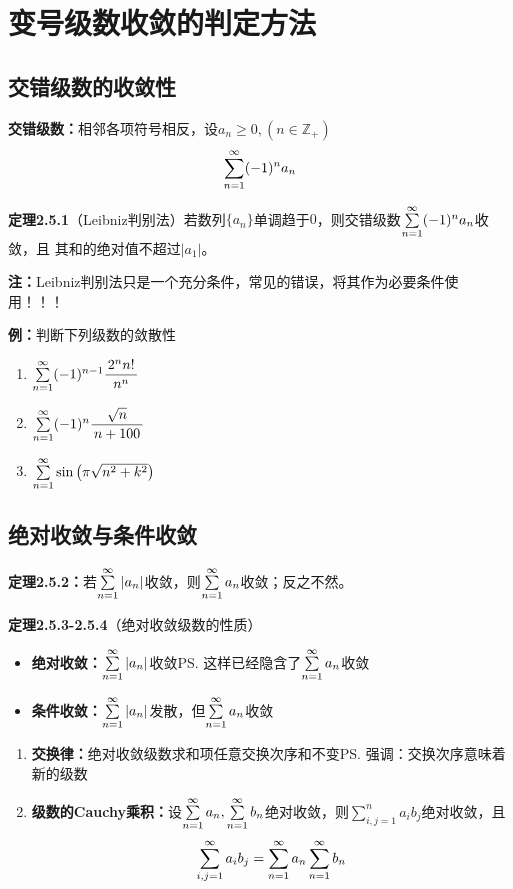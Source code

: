 \section{变号级数收敛的判定方法}

\subsection{交错级数的收敛性}

{\bf 交错级数：}相邻各项符号相反，设$a_n\geq 0,(n\in\mathbb{Z}_+)$
$$\sum\limits_{n=1}^{\infty}(-1)^na_n$$

{\bf 定理2.5.1}（Leibniz判别法）若数列$\{a_n\}$单调趋于$0$，则交错级数$\sum\limits_{n=1}^{\infty} (-1)^na_n$收敛，且
其和的绝对值不超过$|a_1|$。

{\bf 注：}Leibniz判别法只是一个充分条件，常见的错误，将其作为必要条件使用！！！

{\bf 例：}判断下列级数的敛散性
\begin{enumerate} [(1)]
  \setlength{\itemindent}{1cm}
  \item $\sum\limits_{n=1}^{\infty}(-1)^{n-1}\displaystyle\frac{\,{2^nn!}\,}{\,{n^n}\,}$ 
  \item $\sum\limits_{n=1}^{\infty}(-1)^n\displaystyle\frac{\,{\sqrt{n}}\,}{\,{n+100}\,}$ 
  \item $\sum\limits_{n=1}^{\infty}\sin\left(\pi\sqrt{n^2+k^2}\right)$
\end{enumerate}

\subsection{绝对收敛与条件收敛}

{\bf 定理2.5.2：}若$\sum\limits_{n=1}^{\infty} |a_n|$收敛，则$\sum\limits_{n=1}^{\infty} a_n$收敛；反之不然。

{\bf 定理2.5.3-2.5.4}（绝对收敛级数的性质）

\begin{itemize}
  \setlength{\itemindent}{1cm}
  \item {\bf 绝对收敛：}$\sum\limits_{n=1}^{\infty} |a_n|$收敛\ps{这样已经隐含了$\sum\limits_{n=1}^{\infty} a_n$收敛}
  \item {\bf 条件收敛：}$\sum\limits_{n=1}^{\infty} |a_n|$发散，但$\sum\limits_{n=1}^{\infty} a_n$收敛
\end{itemize}

\begin{enumerate}[(1)]
  \setlength{\itemindent}{1cm}
  \item {\bf 交换律：}绝对收敛级数求和项任意交换次序和不变\ps{强调：交换次序意味着新的级数}
  \item {\bf 级数的Cauchy乘积：}设$\sum\limits_{n=1}^{\infty} a_n,\sum\limits_{n=1}^{\infty}
	  b_n$绝对收敛，则$\sum\limits_{i,j=1}^na_ib_j$绝对收敛，且
	  $$\sum\limits_{i,j=1}^{\infty}a_ib_j=\sum\limits_{n=1}^{\infty} a_n\sum\limits_{n=1}^{\infty} b_n$$
\end{enumerate}

